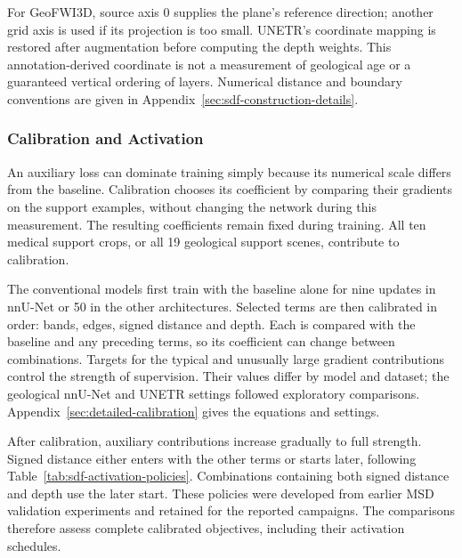 For GeoFWI3D, source axis 0 supplies the plane's reference direction;
another grid axis is used if its projection is too small. UNETR's
coordinate mapping is restored after augmentation before computing
the depth weights. This annotation-derived coordinate is not a
measurement of geological age or a guaranteed vertical ordering of
layers. Numerical distance and boundary conventions are given in
Appendix~\ref{sec:sdf-construction-details}.

\subsubsection{Calibration and Activation}
\label{sec:calibration-methods}

An auxiliary loss can dominate training simply because its numerical
scale differs from the baseline. Calibration chooses its coefficient
by comparing their gradients on the support examples, without changing
the network during this measurement. The resulting coefficients remain
fixed during training. All ten medical support crops, or all 19
geological support scenes, contribute to calibration.

The conventional models first train with the baseline alone for nine
updates in nnU-Net or 50 in the other architectures. Selected terms are
then calibrated in order: bands, edges, signed distance and depth.
Each is compared with the baseline and any preceding terms, so its
coefficient can change between combinations. Targets for the typical
and unusually large gradient contributions control the strength of
supervision. Their values differ by model and dataset; the geological
nnU-Net and UNETR settings followed exploratory comparisons.
Appendix~\ref{sec:detailed-calibration} gives the equations and settings.

After calibration, auxiliary contributions increase gradually to full
strength. Signed distance either enters with the other terms or starts
later, following Table~\ref{tab:sdf-activation-policies}. Combinations
containing both signed distance and depth use the later start. These
policies were developed from earlier MSD validation experiments and
retained for the reported campaigns. The comparisons therefore assess
complete calibrated objectives, including their activation schedules.

